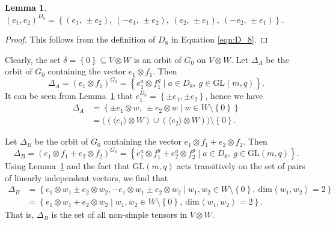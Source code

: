 \documentclass[10pt]{amsart}
\theoremstyle{definition}
\theoremstyle{plain}
\newtheorem{lemma}[lemma]{Lemma}
\theoremstyle{plain}
\theoremstyle{plain}
\theoremstyle{plain}
\newcommand{\GL}{\mathrm{GL}}
\begin{document}
\begin{lemma} \label{lm:V-basis-under-D8}
$\left(e_1, e_2 \right)^{D_8} = \left\{{\left(e_1,\, \pm e_2 \right)},\ {\left(-e_1,\, \pm e_2 \right)},\ {\left(e_2,\, \pm e_1 \right)},\ \left(-e_2,\, \pm e_1 \right)\right\}$.
\end{lemma}
\begin{proof}
This follows from the definition of $D_8$ in Equation \eqref{eqn:D_8}.
\end{proof}

Clearly, the set $\delta = \left\{0 \right\} \subseteq V \otimes W$ is an orbit of $G_0$ on $V \otimes W$. Let $\Delta_A$ be the orbit of $G_0$ containing the vector $e_1 \otimes f_1$. Then
\begin{displaymath}
\Delta_A = \left(e_1 \otimes f_1 \right)^{G_0} = {\left\{e_1^a \otimes f_1^g \mid a \in D_8,\ g \in \GL {\left(m, q \right)}\right\}}.
\end{displaymath}
It can be seen from Lemma~\ref{lm:V-basis-under-D8} that $e_1^{D_8} = \left\{\pm e_1, \pm e_2 \right\}$, hence we have
\begin{align*}
\Delta_A &= \left\{\pm e_1 \otimes w,\ \pm e_2 \otimes w \mid w \in W \setminus \left\{0 \right\}\right\} \\
&= \big(\left(\langle e_1 \rangle \otimes W \right) \cup \left(\langle e_2 \rangle \otimes W \right)\big) \setminus {\left\{0 \right\}}.
\end{align*}

Let $\Delta_B$ be the orbit of $G_0$ containing the vector $e_1 \otimes f_1 + e_2 \otimes f_2$. Then
\begin{displaymath}
\Delta_B = \left(e_1 \otimes f_1 + e_2 \otimes f_2 \right)^{G_0} = {\left\{e_1^a \otimes f_1^g + e_2^a \otimes f_2^g \mid a \in D_8,\ g \in \GL{\left(m, q \right)}\right\}}.
\end{displaymath}
Using Lemma~\ref{lm:V-basis-under-D8} and the fact that $\GL{\left(m, q \right)}$ acts transitively on the set of pairs of linearly independent vectors, we find that
\begin{align*}
\Delta_B &= {\left\{e_1 \otimes w_1 \pm e_2 \otimes w_2, -e_1 \otimes w_1 \pm e_2 \otimes w_2 \mid w_1, w_2 \in W{\setminus} {\left\{0 \right\}},\ \mathrm{dim} \left<w_1, w_2 \right> = 2 \right\}} \\
&= {\left\{e_1 \otimes w_1 + e_2 \otimes w_2 \mid w_1, w_2 \in W \setminus {\left\{0 \right\}},\ \mathrm{dim} \left<w_1, w_2 \right> = 2 \right\}}.
\end{align*}
That is, $\Delta_B$ is the set of all non-simple tensors in $V \otimes W$.
\end{document}
